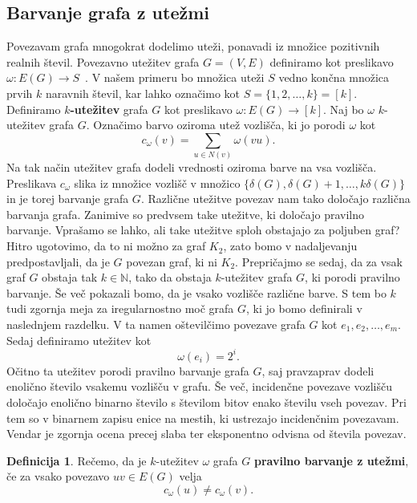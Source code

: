 \documentclass[12pt,a4paper,twoside]{article}
\theoremstyle{definition} %
\newtheorem{definicija}{Definicija}[section]
\theoremstyle{plain} %
\numberwithin{equation}{section}  %
\begin{document}
\subsection{Barvanje grafa z utežmi}


Povezavam grafa mnogokrat dodelimo uteži, ponavadi iz množice pozitivnih realnih števil. Povezavno utežitev grafa $G=(V,E)$ definiramo kot preslikavo  $\omega : E(G) \rightarrow S$~. V našem primeru bo množica uteži $S$ vedno končna množica prvih $k$ naravnih števil, kar lahko označimo kot $S = \{1,2, \ldots, k\}= \left[k\right] $. Definiramo \textbf{$k$-utežitev} grafa $G$ kot preslikavo  $ \omega : E(G)  \rightarrow \left[k\right]$.
Naj bo $\omega$ $k$-utežitev grafa $G$. Označimo barvo oziroma utež vozlišča, ki jo porodi $\omega$ kot
$$ c_{\omega} (v) = \sum_{u \in N(v)} \omega(vu). $$
Na tak način utežitev grafa dodeli vrednosti oziroma barve na vsa vozlišča. Preslikava $c_{\omega}$ slika iz množice vozlišč v množico $\{ \delta(G),\delta(G) + 1, \ldots, k \delta(G)\}$ in je torej barvanje grafa $G$.
Različne utežitve povezav nam tako določajo različna barvanja grafa. Zanimive so predvsem take utežitve, ki določajo pravilno barvanje. Vprašamo se lahko, ali take utežitve sploh obstajajo za poljuben graf? Hitro ugotovimo, da to ni možno za graf $K_2$, zato bomo v nadaljevanju predpostavljali, da je $G$ povezan graf, ki ni $K_2$. Prepričajmo se sedaj, da za vsak graf $G$ obstaja tak $k \in \mathbb{N}$, tako da obstaja $k$-utežitev grafa $G$, ki porodi pravilno barvanje. Še več pokazali bomo, da je vsako vozlišče različne barve. S tem bo $k$ tudi zgornja meja za iregularnostno moč grafa $G$, ki jo bomo definirali v naslednjem razdelku. V ta namen oštevilčimo povezave grafa $G$ kot $e_1, e_2, \ldots, e_m$. Sedaj definiramo utežitev kot 
$$\omega(e_i) = 2 ^i .$$
Očitno ta utežitev porodi pravilno barvanje grafa $G$, saj pravzaprav dodeli enolično število vsakemu vozlišču v grafu. Še več, incidenčne povezave vozlišču določajo enolično binarno število s številom bitov enako številu vseh povezav. Pri tem so v binarnem zapisu enice na mestih, ki ustrezajo incidenčnim povezavam. Vendar je zgornja ocena precej slaba ter eksponentno odvisna od števila povezav.
\begin{definicija}
	Rečemo, da je $k$-utežitev $\omega$ grafa $G$  \textbf{pravilno barvanje z utežmi}, če za vsako povezavo $uv \in E(G)$ velja
	$$c_{\omega} (u) \neq c_{\omega}(v). $$
\end{definicija}
\end{document}
